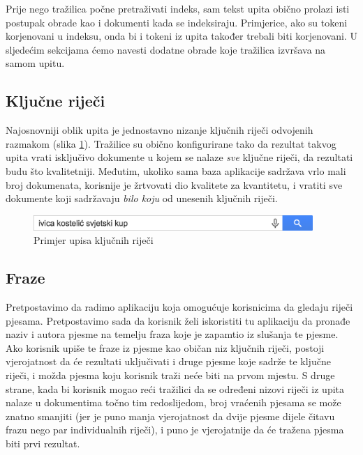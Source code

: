 \documentclass[a4paper,twoside,12pt]{scrreprt}
\begin{document}
Prije nego tražilica počne pretraživati indeks, sam tekst upita obično prolazi isti postupak obrade kao i dokumenti kada se indeksiraju. Primjerice, ako su tokeni korjenovani u indeksu, onda bi i tokeni iz upita također trebali biti korjenovani. U sljedećim sekcijama ćemo navesti dodatne obrade koje tražilica izvršava na samom upitu.

\subsection{Ključne riječi}

Najosnovniji oblik upita je jednostavno nizanje ključnih riječi odvojenih razmakom (slika \ref{keywords}). Tražilice su obično konfigurirane tako da rezultat takvog upita vrati isključivo dokumente u kojem se nalaze \textit{sve} ključne riječi, da rezultati budu što kvalitetniji. Međutim, ukoliko sama baza aplikacije sadržava vrlo mali broj dokumenata, korisnije je žrtvovati dio kvalitete za kvantitetu, i vratiti sve dokumente koji sadržavaju \textit{bilo koju} od unesenih ključnih riječi.

\begin{figure}[H]
  \centering
  \includegraphics[width=300pt]{keywords}
  \caption{Primjer upisa ključnih riječi}
  \label{keywords}
\end{figure}

\subsection{Fraze}

Pretpostavimo da radimo aplikaciju koja omogućuje korisnicima da gledaju riječi pjesama. Pretpostavimo sada da korisnik želi iskoristiti tu aplikaciju da pronađe naziv i autora pjesme na temelju fraza koje je zapamtio iz slušanja te pjesme. Ako korisnik upiše te fraze iz pjesme kao običan niz ključnih riječi, postoji vjerojatnost da će rezultati uključivati i druge pjesme koje sadrže te ključne riječi, i možda pjesma koju korisnik traži neće biti na prvom mjestu. S druge strane, kada bi korisnik mogao reći tražilici da se određeni nizovi riječi iz upita nalaze u dokumentima točno tim redoslijedom, broj vraćenih pjesama se može znatno smanjiti (jer je puno manja vjerojatnost da dvije pjesme dijele čitavu frazu nego par individualnih riječi), i puno je vjerojatnije da će tražena pjesma biti prvi rezultat.
\end{document}
